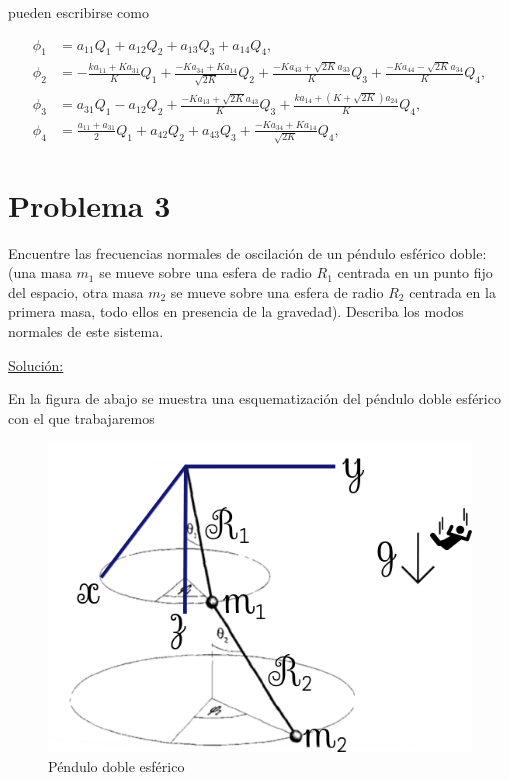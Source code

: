 \documentclass[a4paper,10pt]{article}
\numberwithin{equation}{section}
\begin{document}
pueden escribirse como

\begin{align*}
 \phi_1 &= a_{11}Q_1 + a_{12}Q_2 + a_{13}Q_3 + a_{14}Q_4, \\
 \phi_2 &= - \frac{ka_{11} + Ka_{31}}{K}Q_1 + \frac{-K a_{34} + Ka_{14}}{\sqrt{2K}}Q_2 + 
 \frac{- Ka_{43} + \sqrt{2K}a_{33}}{K}Q_3 + \frac{- Ka_{44} - \sqrt{2K}a_{34}}{K}Q_4, \\
 \phi_3 &= a_{31}Q_1 - a_{12}Q_2 + \frac{-Ka_{13} + \sqrt{2K}a_{43}}{K}Q_3 + 
 \frac{ka_{14} + (K + \sqrt{2K})a_{24}}{K}Q_4, \\
 \phi_4 &=  \frac{a_{11} + a_{31}}{2}Q_1 + a_{42}Q_2 + a_{43}Q_3 + 
 \frac{-K a_{34} + Ka_{14}}{\sqrt{2K}}Q_4,
\end{align*}


\section{Problema 3}

Encuentre las frecuencias normales de oscilación de un péndulo esférico doble: (una 
masa $m_1$ se mueve sobre una esfera de radio $R_1$ centrada en un punto fijo del 
espacio, otra masa $m_2$ se mueve sobre una esfera de radio $R_2$ centrada en la 
primera masa, todo ellos en presencia de la gravedad). Describa los modos normales 
de este sistema.

\vspace{.3cm}

\underline{Solución:} \vspace{.3cm}

En la figura de abajo se muestra una esquematización del péndulo doble esférico
con el que trabajaremos

\begin{figure}[H]
 \center 
 \includegraphics[scale=0.43]{problema3fig1}
 \caption{Péndulo doble esférico}
 \label{fig:problema3fig1}
\end{figure}
\end{document}
